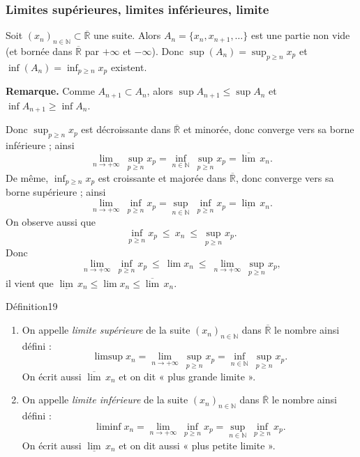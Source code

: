 \documentclass[11pt,a4paper]{article}
\newcommand{\N}{\mathbb{N}}
\newcommand{\Rb}{\overline{\mathbb{R}}}
\begin{document}
\subsubsection*{Limites supérieures, limites inférieures, limite}

Soit $(x_n)_{n\in\N}\subset\Rb$ une suite. Alors $A_n=\{x_n,x_{n+1},\dots\}$ est une partie non vide (et bornée dans $\Rb$ par $+\infty$ et $-\infty$).
Donc $\sup(A_n)=\sup_{p\ge n}x_p$ et $\inf(A_n)=\inf_{p\ge n}x_p$ existent.

\textbf{\color{bleu}Remarque.} Comme $A_{n+1}\subset A_n$, alors $\sup A_{n+1}\le\sup A_n$ et $\inf A_{n+1}\ge\inf A_n$.

Donc $\sup_{p\ge n}x_p$ est décroissante dans $\Rb$ et minorée, donc converge vers sa borne inférieure ; ainsi
\[
  \lim_{n\to+\infty}\ \sup_{p\ge n}x_p=\inf_{n\in\N}\ \sup_{p\ge n}x_p=\overline{\lim}\,x_n .
\]
De même, $\inf_{p\ge n}x_p$ est croissante et majorée dans $\Rb$, donc converge vers sa borne supérieure ; ainsi
\[
  \lim_{n\to+\infty}\ \inf_{p\ge n}x_p=\sup_{n\in\N}\ \inf_{p\ge n}x_p=\underline{\lim}\,x_n .
\]
On observe aussi que
\[
  \inf_{p\ge n}x_p\ \le\ x_n\ \le\ \sup_{p\ge n}x_p .
\]
Donc
\[
  \lim_{n\to+\infty}\ \inf_{p\ge n}x_p\ \le\ \lim x_n\ \le\ \lim_{n\to+\infty}\ \sup_{p\ge n}x_p ,
\]
il vient que $\underline{\lim}\,x_n\le\lim x_n\le\overline{\lim}\,x_n$.

\begin{enonce}{Définition}{19}
\begin{enumerate}[label=\textbf{\arabic*)},leftmargin=1.2cm]
  \item On appelle \emph{limite supérieure} de la suite $(x_n)_{n\in\N}$ dans $\Rb$ le nombre ainsi défini :
  \[
    \limsup x_n=\lim_{n\to+\infty}\ \sup_{p\ge n}x_p=\inf_{n\in\N}\ \sup_{p\ge n}x_p .
  \]
  On écrit aussi $\overline{\lim}\,x_n$ et on dit « plus grande limite ».
  \item On appelle \emph{limite inférieure} de la suite $(x_n)_{n\in\N}$ dans $\Rb$ le nombre ainsi défini :
  \[
    \liminf x_n=\lim_{n\to+\infty}\ \inf_{p\ge n}x_p=\sup_{n\in\N}\ \inf_{p\ge n}x_p .
  \]
  On écrit aussi $\underline{\lim}\,x_n$ et on dit aussi « plus petite limite ».
\end{enumerate}
\end{enonce}
\end{document}
